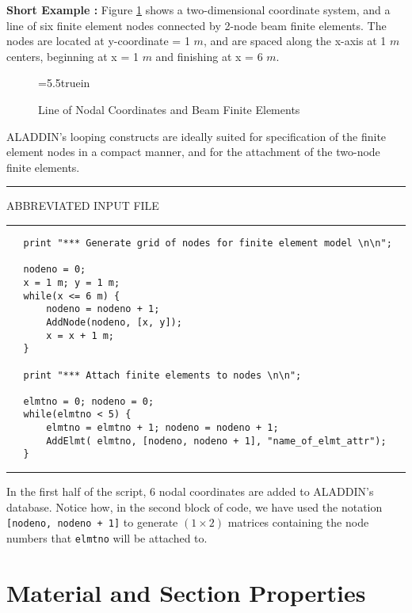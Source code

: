 \vspace{0.15 in}\noindent
{\bf Short Example :} Figure \ref{fig:fe-cantilever-mesh} shows
a two-dimensional coordinate system, and a line of six finite element
nodes connected by 2-node beam finite elements.
The nodes are located at y-coordinate = 1 $m$,
and are spaced along the x-axis at 1 $m$ centers,
beginning at x = 1 $m$ and finishing at x = 6 $m$.

\begin{figure} [ht]
\vspace{0.10 in}
\epsfxsize=5.5truein
\centerline{}
\caption{Line of Nodal Coordinates and Beam Finite Elements}
\label{fig:fe-cantilever-mesh}
\end{figure}

\vspace{0.15 in}
\noindent\hspace{0.5 in}
ALADDIN's looping constructs are ideally suited for 
specification of the finite element nodes in a compact manner,
and for the attachment of the two-node finite elements.

\vspace{0.15 in}
\begin{footnotesize}
\noindent
{\rule{2.1 in}{0.035 in} ABBREVIATED INPUT FILE \rule{2.1 in}{0.035 in} }
\begin{verbatim}
   print "*** Generate grid of nodes for finite element model \n\n";

   nodeno = 0;
   x = 1 m; y = 1 m;
   while(x <= 6 m) {
       nodeno = nodeno + 1;
       AddNode(nodeno, [x, y]);
       x = x + 1 m;
   }

   print "*** Attach finite elements to nodes \n\n";

   elmtno = 0; nodeno = 0;
   while(elmtno < 5) {
       elmtno = elmtno + 1; nodeno = nodeno + 1;
       AddElmt( elmtno, [nodeno, nodeno + 1], "name_of_elmt_attr");
   }
\end{verbatim}
\rule{6.25 in}{0.035 in}
\end{footnotesize}

\vspace{0.15 in}\noindent
In the first half of the script, 6 nodal coordinates are added to ALADDIN's database.
Notice how, in the second block of code,
we have used the notation {\tt [nodeno, nodeno + 1]} to
generate $(1 \times 2)$ matrices containing the
node numbers that {\tt elmtno} will be attached to.

\section{Material and Section Properties}
\label{ref:material-and-section}

